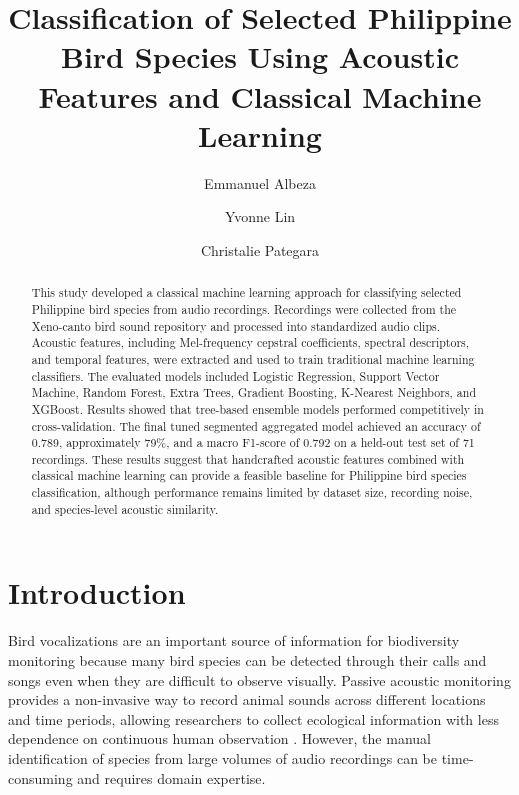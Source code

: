 \documentclass[runningheads]{llncs}
\begin{document}
\title{Classification of Selected Philippine Bird Species Using Acoustic Features and Classical Machine Learning}

\author{Emmanuel Albeza \and Yvonne Lin \and Christalie Pategara}


\maketitle

\begin{abstract}
This study developed a classical machine learning approach for classifying selected Philippine bird species from audio recordings. Recordings were collected from the Xeno-canto bird sound repository and processed into standardized audio clips. Acoustic features, including Mel-frequency cepstral coefficients, spectral descriptors, and temporal features, were extracted and used to train traditional machine learning classifiers. The evaluated models included Logistic Regression, Support Vector Machine, Random Forest, Extra Trees, Gradient Boosting, K-Nearest Neighbors, and XGBoost. Results showed that tree-based ensemble models performed competitively in cross-validation. The final tuned segmented aggregated model achieved an accuracy of 0.789, approximately 79\%, and a macro F1-score of 0.792 on a held-out test set of 71 recordings. These results suggest that handcrafted acoustic features combined with classical machine learning can provide a feasible baseline for Philippine bird species classification, although performance remains limited by dataset size, recording noise, and species-level acoustic similarity.

\end{abstract}

\section{Introduction}

Bird vocalizations are an important source of information for biodiversity monitoring because many bird species can be detected through their calls and songs even when they are difficult to observe visually. Passive acoustic monitoring provides a non-invasive way to record animal sounds across different locations and time periods, allowing researchers to collect ecological information with less dependence on continuous human observation \cite{szymanski2021,biffi2024,mosikidi2023}. However, the manual identification of species from large volumes of audio recordings can be time-consuming and requires domain expertise.
\end{document}
